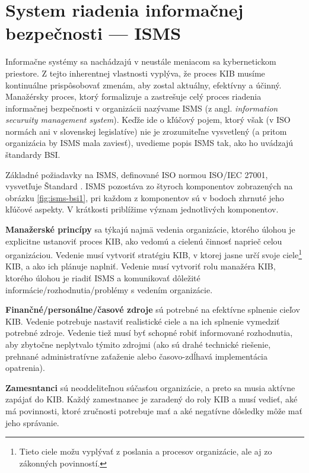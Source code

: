 \section{System riadenia informačnej bezpečnosti --- ISMS}
\label{sec:isms}

Informačne systémy sa nachádzajú v neustále meniacom sa kybernetickom priestore. Z tejto inherentnej vlastnosti vyplýva, že proces
KIB musíme kontinuálne prispôsobovať zmenám, aby zostal aktuálny, efektívny a účinný. Manažérsky proces, ktorý formalizuje
a zastrešuje celý proces riadenia informačnej bezpečnosti v organizácii nazývame ISMS (z angl. \emph{information securuity
management system}). Keďže ide o kľúčový pojem, ktorý však (v ISO normách ani v slovenskej legislatíve) nie je zrozumiteľne
vysvetlený (a pritom organizácia by ISMS mala zaviesť), uvedieme popis ISMS tak, ako ho uvádzajú štandardy BSI.

Základné požiadavky na ISMS, definované ISO normou ISO/IEC 27001, vysvetľuje  Štandard \cite{BSI1}. ISMS pozostáva zo štyroch
komponentov zobrazených na obrázku \ref{fig:isms-bsi1}, pri každom z komponentov sú v bodoch zhrnuté jeho kľúčové aspekty. 
V krátkosti priblížime význam jednotlivých komponentov. 



\textbf{Manažerské princípy} sa týkajú najmä vedenia organizácie, ktorého úlohou je explicitne ustanoviť proces KIB, ako vedomú
a cielenú činnosť naprieč celou organizáciou. Vedenie musí vytvoriť stratégiu KIB, v ktorej jasne určí svoje
ciele\footnote{Tieto ciele možu vyplývať z poslania a procesov organizácie, ale aj zo zákonných povinností.} KIB, a ako ich
plánuje naplniť. Vedenie musí vytvoriť rolu manažéra KIB, ktorého úlohou je riadiť ISMS a komunikovať dôležité
informácie/rozhodnutia/problémy s vedením organizácie.

\textbf{Finančné/personálne/časové zdroje} sú potrebné na efektívne splnenie cieľov KIB. Vedenie potrebuje
nastaviť realistické ciele a na ich splnenie vymedziť potrebné zdroje. Vedenie tiež musí byť schopné robiť informované rozhodnutia,
aby zbytočne neplytvalo týmito zdrojmi (ako sú drahé technické riešenie, prehnané administratívne zaťaženie
alebo časovo-zdĺhavá implementácia opatrenia).

\textbf{Zamesntanci} sú neoddeliteľnou súčasťou organizácie, a preto sa musia aktívne zapájať do KIB. Každý zamestnanec je
zaradený do roly KIB a musí vedieť, aké má povinnosti, ktoré zručnosti potrebuje mať a aké negatívne dôsledky môže mať
jeho správanie.

